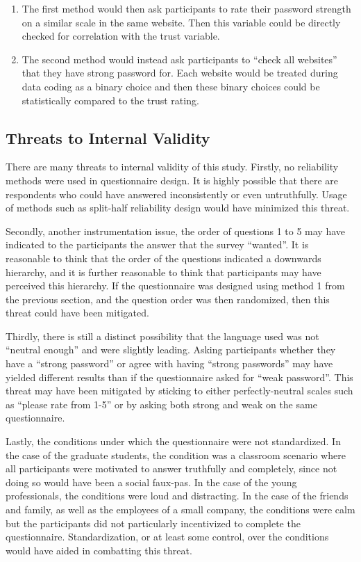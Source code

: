 \documentclass[letterpaper, 10 pt, conference]{ieeeconf}  %
\begin{document}
\begin{enumerate}
\item The first method would then ask participants to rate their password strength on a similar scale in the same website. Then this variable could be directly checked for correlation with the trust variable.
\item The second method would instead ask participants to “check all websites” that they have strong password for. Each website would be treated during data coding as a binary choice and then these binary choices could be statistically compared to the trust rating. 
\end{enumerate}

\subsection{Threats to Internal Validity}

There are many threats to internal validity of this study. Firstly, no reliability methods were used in questionnaire design. It is highly possible that there are respondents who could have answered inconsistently or even untruthfully. Usage of methods such as split-half reliability design would have minimized this threat. 

Secondly, another instrumentation issue, the order of questions 1 to 5 may have indicated to the participants the answer that the survey “wanted”. It is reasonable to think that the order of the questions indicated a downwards hierarchy, and it is further reasonable to think that participants may have perceived this hierarchy. If the questionnaire was designed using method 1 from the previous section, and the question order was then randomized, then this threat could have been mitigated.

Thirdly, there is still a distinct possibility that the language used was not “neutral enough” and were slightly leading. Asking participants whether they have a “strong password” or agree with having “strong passwords” may have yielded different results than if the questionnaire asked for “weak password”. This threat may have been mitigated by sticking to either perfectly-neutral scales such as “please rate from 1-5” or by asking both strong and weak on the same questionnaire.

Lastly, the conditions under which the questionnaire were not standardized. In the case of the graduate students, the condition was a classroom scenario where all participants were motivated to answer truthfully and completely, since not doing so would have been a social faux-pas. In the case of the young professionals, the conditions were loud and distracting. In the case of the friends and family, as well as the employees of a small company, the conditions were calm but the participants did not particularly incentivized to complete the questionnaire. Standardization, or at least some control, over the conditions would have aided in combatting this threat. 
\end{document}
